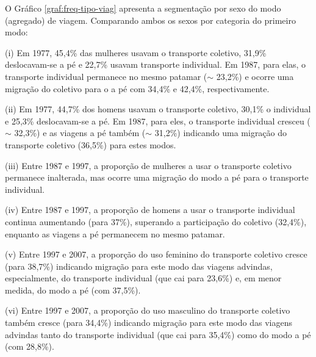 O Gráfico \ref{graf:freq-tipo-viag} apresenta a segmentação por sexo do modo (agregado) de viagem.
Comparando ambos os sexos por categoria do primeiro modo:
\begin{compactitem}[]
\item (i) Em 1977, 45,4\% das mulheres usavam o transporte coletivo, 31,9\% deslocavam-se a pé e 22,7\% usavam transporte individual. Em 1987, para elas, o transporte individual permanece no mesmo patamar ($\sim$ 23,2\%) e ocorre uma migração do coletivo para o a pé com 34,4\% e 42,4\%, respectivamente.
\item (ii) Em 1977, 44,7\% dos homens usavam o transporte coletivo, 30,1\% o individual e 25,3\% deslocavam-se a pé. Em 1987, para eles, o transporte individual cresceu ($\sim$ 32,3\%) e as viagens a pé também ($\sim$ 31,2\%) indicando uma migração do transporte coletivo (36,5\%) para estes modos.
\item (iii) Entre 1987 e 1997, a proporção de mulheres a usar o transporte coletivo permanece inalterada, mas ocorre uma migração do modo a pé para o transporte individual.
\item (iv) Entre 1987 e 1997, a proporção de homens a usar o transporte individual continua aumentando (para 37\%), superando a participação do coletivo (32,4\%), enquanto as viagens a pé permanecem no mesmo patamar.
\item (v) Entre 1997 e 2007, a proporção do uso feminino do transporte coletivo cresce (para 38,7\%) indicando migração para este modo das viagens advindas, especialmente, do transporte individual (que cai para 23,6\%) e, em menor medida, do modo a pé (com 37,5\%). 
\item (vi) Entre 1997 e 2007, a proporção do uso masculino do transporte coletivo também cresce (para 34,4\%) indicando migração para este modo das viagens advindas tanto do transporte individual (que cai para 35,4\%) como do modo a pé (com 28,8\%).
\end{compactitem}

